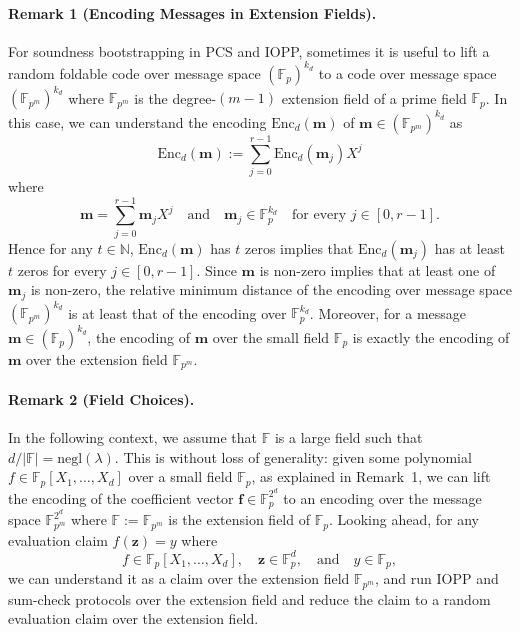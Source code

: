 \paragraph{Remark 1 (Encoding Messages in Extension Fields).}
For soundness bootstrapping in PCS and IOPP, sometimes it is useful to lift a random foldable code over message space $(\mathbb{F}_p)^{k_d}$ to a code over message space $(\mathbb{F}_{p^m})^{k_d}$ where $\mathbb{F}_{p^m}$ is the degree-$(m-1)$ extension field of a prime field $\mathbb{F}_p$. 
In this case, we can understand the encoding $\mathrm{Enc}_d(\mathbf{m})$ of $\mathbf{m} \in (\mathbb{F}_{p^m})^{k_d}$ as
\[
\mathrm{Enc}_d(\mathbf{m}) := \sum_{j=0}^{r-1} \mathrm{Enc}_d(\mathbf{m}_j) X^j
\]
where
\[
\mathbf{m} = \sum_{j=0}^{r-1} \mathbf{m}_j X^j
\quad \text{and} \quad
\mathbf{m}_j \in \mathbb{F}_p^{k_d}
\quad \text{for every } j \in [0,r-1].
\]
Hence for any $t \in \mathbb{N}$, $\mathrm{Enc}_d(\mathbf{m})$ has $t$ zeros implies that $\mathrm{Enc}_d(\mathbf{m}_j)$ has at least $t$ zeros for every $j \in [0,r-1]$. 
Since $\mathbf{m}$ is non-zero implies that at least one of $\mathbf{m}_j$ is non-zero, the relative minimum distance of the encoding over message space $(\mathbb{F}_{p^m})^{k_d}$ is at least that of the encoding over $\mathbb{F}_p^{k_d}$. 
Moreover, for a message $\mathbf{m} \in (\mathbb{F}_p)^{k_d}$, the encoding of $\mathbf{m}$ over the small field $\mathbb{F}_p$ is exactly the encoding of $\mathbf{m}$ over the extension field $\mathbb{F}_{p^m}$.

\paragraph{Remark 2 (Field Choices).}
In the following context, we assume that $\mathbb{F}$ is a large field such that $d / |\mathbb{F}| = \mathrm{negl}(\lambda)$. 
This is without loss of generality: given some polynomial $f \in \mathbb{F}_p[X_1,\ldots,X_d]$ over a small field $\mathbb{F}_p$, as explained in Remark~1, we can lift the encoding of the coefficient vector $\mathbf{f} \in \mathbb{F}_p^{2^d}$ to an encoding over the message space $\mathbb{F}_{p^m}^{2^d}$ where $\mathbb{F} := \mathbb{F}_{p^m}$ is the extension field of $\mathbb{F}_p$. 
Looking ahead, for any evaluation claim $f(\mathbf{z}) = y$ where
\[
f \in \mathbb{F}_p[X_1,\ldots,X_d], 
\quad \mathbf{z} \in \mathbb{F}_p^d,
\quad \text{and} \quad y \in \mathbb{F}_p,
\]
we can understand it as a claim over the extension field $\mathbb{F}_{p^m}$, and run IOPP and sum-check protocols over the extension field and reduce the claim to a random evaluation claim over the extension field.